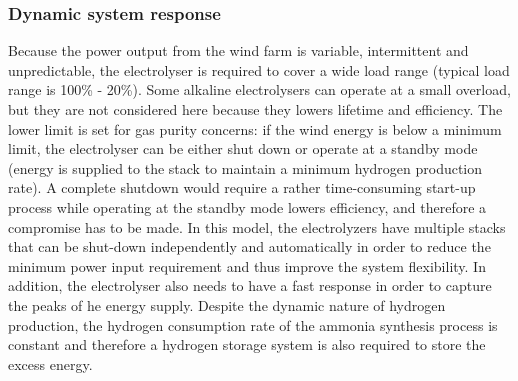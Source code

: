 \subsubsection{Dynamic system response}
Because the power output from the wind farm is variable, intermittent and unpredictable, the electrolyser is required to cover a wide load range (typical load range is 100\% - 20\%\cite{gas}). Some alkaline electrolysers can operate at a small overload, but they are not considered here because they lowers lifetime and efficiency. The lower limit is set for gas purity concerns: if the wind energy is below a minimum limit, the electrolyser can be either shut down or operate at a standby mode\cite{gas} (energy is supplied to the stack to maintain a minimum hydrogen production rate). A complete shutdown would require a rather time-consuming start-up process while operating at the standby mode lowers efficiency, and therefore a compromise has to be made. In this model, the electrolyzers have multiple stacks that can be shut-down independently and automatically in order to reduce the minimum power input requirement and thus improve the system flexibility.  In addition, the electrolyser also needs to have a fast response in order to capture the peaks of he energy supply. Despite the dynamic nature of hydrogen production, the hydrogen consumption rate of the ammonia synthesis process is constant and therefore a hydrogen storage system is also required to store the excess energy. 
